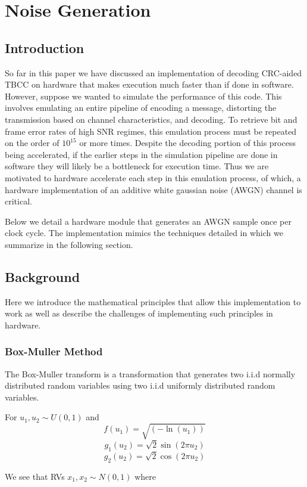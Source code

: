 \chapter{Noise Generation}

\section{Introduction}
So far in this paper we have discussed an implementation of decoding CRC-aided TBCC on hardware that makes execution much faster than if done in software. However, suppose we wanted to simulate the performance of this code. This involves emulating an entire pipeline of encoding a message, distorting the transmission based on channel characteristics, and decoding. To retrieve bit and frame error rates of high SNR regimes, this emulation process must be repeated on the order of $10^15$ or more times. Despite the decoding portion of this process being accelerated, if the earlier steps in the simulation pipeline are done in software they will likely be a bottleneck for execution time. Thus we are motivated to hardware accelerate each step in this emulation process, of which, a hardware implementation of an additive white gaussian noise (AWGN) channel is critical. 

Below we detail a hardware module that generates an AWGN sample once per clock cycle. The implementation mimics the techniques detailed in \cite{noise_gen} which we summarize in the following section.


\section{Background}

Here we introduce the mathematical principles that allow this implementation to work as well as describe the challenges of implementing such principles in hardware.

\subsection{Box-Muller Method}
The Box-Muller transform is a transformation that generates two i.i.d normally distributed random variables using two i.i.d uniformly distributed random variables.

For $u_1, u_2 \sim U(0,1)$ and
$$f(u_1) = \sqrt{(- \ln(u_1))}$$
$$g_1(u_2) = \sqrt{2} \sin(2 \pi u_2)$$
$$g_2(u_2) = \sqrt{2} \cos(2 \pi u_2)$$

We see that RVs $x_1,x_2 \sim N(0,1)$ where

